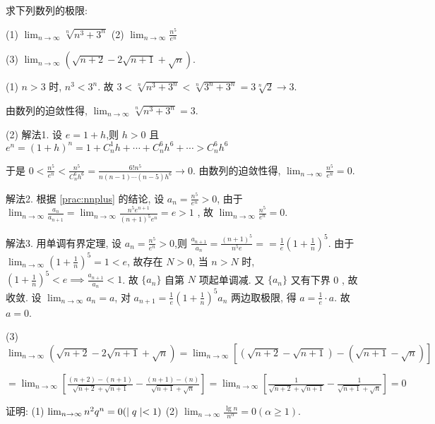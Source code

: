 \chapterhomework

\begin{practice}
    求下列数列的极限:

    (1) $\lim_{n\to\infty} \sqrt[n]{n^3+3^n}$ \qquad (2) $\lim_{n\to\infty} \frac{n^5}{e^n}$

    (3) $\lim_{n\to\infty} (\sqrt{n+2}-2\sqrt{n+1}+\sqrt{n})$.
\end{practice}

\begin{solve}
    (1) $n>3$ 时, $n^3<3^n$. 故 $3<\sqrt[n]{n^3+3^n}<\sqrt[n]{3^n+3^n}=3\sqrt[n]{2}\to 3$.
    
    由数列的迫敛性得, $\lim_{n\to\infty} \sqrt[n]{n^3+3^n} = 3$.

    (2) 解法1. 设 $e=1+h$,则 $h>0$ 且 $e^n = (1+h)^n=1+C_n^1 h +\cdots + C_n^6 h^6+\cdots>C_n^6 h^6$

    于是 $0<\frac{n^5}{e^n} < \frac{n^5}{C_n^6 h^6} = 
    \frac{6!n^5}{n(n-1)\cdots(n-5)h^6}\to 0$. 由数列的迫敛性得, $\lim_{n\to\infty} \frac{n^5}{e^n}=0$.

    解法2. 根据 \ref{prac:nnplus} 的结论, 设 $a_n=\frac{n^5}{e^n}>0$, 由于 $\lim_{n\to\infty} \frac{a_n}{a_{n+1}} = \lim_{n\to\infty} \frac{n^5e^{n+1}}{(n+1)^5e^n}
    = e>1$ , 故 $\lim_{n\to\infty} \frac{n^5}{e^n}=0$.

    解法3. 用单调有界定理, 设  $a_n=\frac{n^5}{e^n}>0$,则  $\frac{a_{n+1}}{a_n} = \frac{(n+1)^5}{n^5e} =
    = \frac{1}{e}(1+\frac{1}{n})^5$. 由于 $\lim_{n\to\infty} (1+\frac{1}{n})^5 = 1 < e$, 故存在 $N>0$, 当 $n>N$ 时, $(1+\frac{1}{n})^5<e \implies \frac{a_{n+1}}{a_n}<1$. 故 $\{a_n\}$  自第 $N$ 项起单调减. 又 $\{a_n\}$ 又有下界 0 , 故收敛. 设 $\lim_{n\to\infty} a_n=a$, 对 $a_{n+1}=\frac{1}{e}(1+\frac{1}{n})^5 a_n$ 两边取极限, 得 $a=\frac{1}{e}\cdot a$. 故 $a=0$. 

    (3) $\lim_{n\to\infty} (\sqrt{n+2}-2\sqrt{n+1}+\sqrt{n})
    = \lim_{n\to\infty} [(\sqrt{n+2}-\sqrt{n+1})-(\sqrt{n+1}-\sqrt{n})]
    $

    $
    = \lim_{n\to\infty} [\frac{(n+2)-(n+1)}{\sqrt{n+2}+\sqrt{n+1}}-\frac{(n+1)-(n)}{\sqrt{n+1}+\sqrt{n}}]=\lim_{n\to\infty} [\frac{1}{\sqrt{n+2}+\sqrt{n+1}}-\frac{1}{\sqrt{n+1}+\sqrt{n}}]=0 $
\end{solve}

\begin{practice}
    证明: (1)  $\lim_{n\to\infty} n^2q^n=0(\mid q \mid<1)$ 
    \qquad (2) $\lim_{n\to\infty} \frac{\lg n}{n^{\alpha}}=0    \left(\alpha \geqslant1 \right).$
\end{practice}

